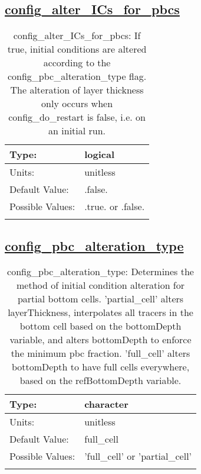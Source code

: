 \subsection[config\_alter\_ICs\_for\_pbcs]{\hyperref[sec:nm_tab_partial_bottom_cells]{config\_alter\_ICs\_for\_pbcs}}
\label{subsec:nm_sec_config_alter_ICs_for_pbcs}
\begin{center}
\begin{longtable}{| p{2.0in} || p{4.0in} |}
    \hline
    Type: & logical \\
    \hline
    Units: & \si{unitless} \\
    \hline
    Default Value: & .false. \\
    \hline
    Possible Values: & .true. or .false. \\
    \hline
    \caption{config\_alter\_ICs\_for\_pbcs: If true, initial conditions are altered according to the config\_pbc\_alteration\_type flag. The alteration of layer thickness only occurs when config\_do\_restart is false, i.e. on an initial run.}
\end{longtable}
\end{center}
\subsection[config\_pbc\_alteration\_type]{\hyperref[sec:nm_tab_partial_bottom_cells]{config\_pbc\_alteration\_type}}
\label{subsec:nm_sec_config_pbc_alteration_type}
\begin{center}
\begin{longtable}{| p{2.0in} || p{4.0in} |}
    \hline
    Type: & character \\
    \hline
    Units: & \si{unitless} \\
    \hline
    Default Value: & full\_cell \\
    \hline
    Possible Values: & 'full\_cell' or 'partial\_cell' \\
    \hline
    \caption{config\_pbc\_alteration\_type: Determines the method of initial condition alteration for partial bottom cells. 'partial\_cell' alters layerThickness, interpolates all tracers in the bottom cell based on the bottomDepth variable, and alters bottomDepth to enforce the minimum pbc fraction. 'full\_cell' alters bottomDepth to have full cells everywhere, based on the refBottomDepth variable.}
\end{longtable}
\end{center}
